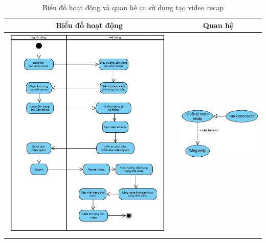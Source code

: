 \noindent 
\begin{table}[H]
\centering
\caption{Biểu đồ hoạt động và quan hệ ca sử dụng tạo video recap}
\label{tab:create-video-recap-usecase-activity}
\begin{tabular}{| c | c |}
    \hline
    \textbf{Biểu đồ hoạt động} & \textbf{Quan hệ} \\ 
    \hline
    \includegraphics[width=0.6\linewidth]{figures/c3/3-3-9-activity-diagram.png} 
    &  
    \includegraphics[width=0.35\linewidth]{figures/c3/3-3-9-relationship.png} \\ 
    \hline
\end{tabular}
\end{table}

